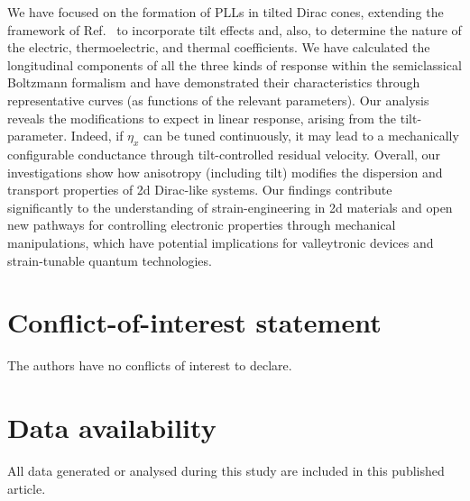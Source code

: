 \documentclass[aps,prb, onecolumn, nofootinbib, citeautoscript,10pt]{revtex4-2}
\begin{document}
We have focused on the formation of PLLs in tilted Dirac cones, extending the framework of Ref.~\cite{strained-dirac-franz} to incorporate tilt effects and, also, to determine the nature of the electric, thermoelectric, and thermal coefficients. We have calculated the longitudinal components of all the three kinds of response within the semiclassical Boltzmann formalism and have demonstrated their characteristics through representative curves (as functions of the relevant parameters). Our analysis reveals the modifications to expect in linear response, arising from the tilt-parameter. Indeed, if $\eta_x$ can be tuned continuously, it may lead to a mechanically configurable conductance through tilt-controlled residual velocity. Overall, our investigations show how anisotropy (including tilt) modifies the dispersion and transport properties of 2d Dirac-like systems. Our findings contribute significantly to the understanding of strain-engineering in 2d materials and open new pathways for controlling electronic properties through mechanical manipulations, which have potential implications for valleytronic devices and strain-tunable quantum technologies.


\section*{Conflict-of-interest statement}
The authors have no conflicts of interest to declare.

\section*{Data availability}
All data generated or analysed during this study are included in this published article.






\appendix
\end{document}
